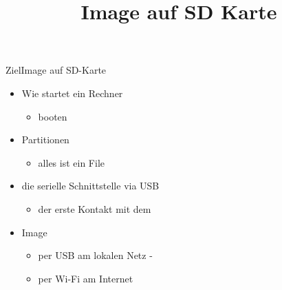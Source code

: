 \documentclass{beamer}
\title{Image auf SD Karte}
\begin{document}
\newcommand{\distro}{sd-2016-09-28.img.gz}

\frame{\titlepage}

\begin{frame}{Ziel}{Image auf SD-Karte}
 \begin{itemize}
  \item Wie startet ein Rechner
  \begin{itemize}
   \item booten
  \end{itemize}
  \item Partitionen
  \begin{itemize}
   \item alles ist ein File
  \end{itemize}
  \item die serielle Schnittstelle via USB
  \begin{itemize}
   \item der erste Kontakt mit dem \target
  \end{itemize}
  \item Image
  \begin{itemize}
   \item per USB am lokalen Netz \host - \targetS
   \item per Wi-Fi am Internet
  \end{itemize}
 \end{itemize}
\end{frame}





\end{document}
